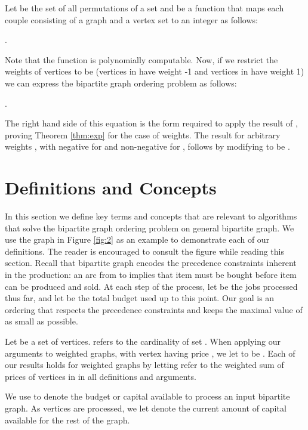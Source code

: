 \documentclass[letterpaper,11pt,abstracton]{scrartcl}
\begin{document}
Let  be the set of all permutations of a set  and  be a
function that maps each couple consisting of a graph  and a
vertex set  to an integer as
follows:

\begin{center}
.
\end{center}
Note that the function  is polynomially computable. Now, if we
restrict the weights of vertices to be  (vertices in  have
weight -1 and vertices in  have weight 1) we can express the
bipartite graph ordering problem as follows:

\begin{center}
.
\end{center}

The right hand side of this equation is the form required to apply the result of
\cite{BFKKT}, proving Theorem \ref{thm:exp} for the case of  weights.
The result for arbitrary weights , with  negative for  and
 non-negative for , follows by modifying  to be
.



\section{Definitions and Concepts} \label{sec:main}

In this section we define key terms and concepts that are relevant to
algorithms that solve the bipartite graph ordering problem on general bipartite graph.  We use the graph in Figure \ref{fig:2} as an example to
demonstrate each of our definitions.  The reader is encouraged to
consult the figure while reading this section.  Recall that bipartite graph
 encodes the precedence constraints inherent in the
production: an arc from  to  implies that item 
must be bought before item  can be produced and sold.
At each step  of the process, let  be the jobs processed
thus far, and let  be the total budget used
up to this point.  Our goal is an ordering that respects the precedence
constraints and keeps the maximal value of  as small as possible.


Let  be a set of vertices.  refers to the cardinality of set
.  When applying our arguments to weighted graphs, with vertex 
having price , we let  to be .
Each of our results holds for weighted graphs by letting  refer
to the weighted sum of prices of vertices in  in all definitions and
arguments.

We use  to denote the budget or capital available to process an
input bipartite graph.  As vertices are processed, we let  denote the current
amount of capital available for the rest of the graph.
\end{document}
